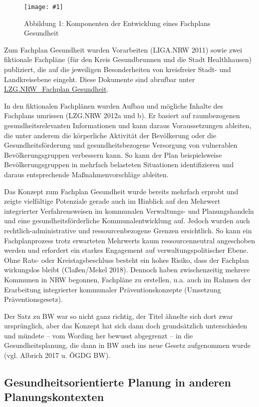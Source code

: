 \documentclass{article}
\newlength{\imgwidth}
\newcommand\scaledgraphics[2]{%
                
\settowidth{\imgwidth}{\texttt{[image: \#1]}}%
                
\setlength{\imgwidth}{\minof{\imgwidth}{#2\textwidth}}%
                
\texttt{[image: \#1]}%
                
}
\begin{document}
\begin{figure}
\scaledgraphics{51b1801d-0dfc-4206-a829-66270db0aee8.jpg}{1}
\caption*{Abbildung 1: Komponenten der Entwicklung eines Fachplans Gesundheit}\label{F19907881}
\end{figure}


Zum Fachplan Gesundheit wurden Vorarbeiten (LIGA.NRW 2011) sowie zwei fiktionale Fachpläne (für den Kreis Gesundbrunnen und die Stadt Healthhausen) publiziert, die auf die jeweiligen Besonderheiten von kreisfreier Stadt- und Landkreisebene eingeht. Diese Dokumente sind abrufbar unter \href{www.lzg.nrw.de/9116816}{LZG.NRW\_Fachplan Gesundheit}. 


In den fiktionalen Fachplänen wurden Aufbau und mögliche Inhalte des Fachplans umrissen (LZG.NRW 2012a und b). Er basiert auf raumbezogenen gesundheitsrelevanten Informationen und kann daraus Voraussetzungen ableiten, die unter anderem die körperliche Aktivität der Bevölkerung oder die Gesundheitsförderung und gesundheitsbezogene Versorgung von vulnerablen Bevölkerungsgruppen verbessern kann. So kann der Plan beispielsweise Bevölkerungsgruppen in mehrfach belasteten Situationen identifizieren und daraus entsprechende Maßnahmenvorschläge ableiten.


Das Konzept zum Fachplan Gesundheit wurde bereits mehrfach erprobt und zeigte vielfältige Potenziale gerade auch im Hinblick auf den Mehrwert integrierter Verfahrensweisen im kommunalen Verwaltungs- und Planungshandeln und eine gesundheitsförderliche Kommunalentwicklung auf. Jedoch wurden auch rechtlich-administrative und ressourcenbezogene Grenzen ersichtlich. So kann ein Fachplanprozess trotz erwarteten Mehrwerts kaum ressourcenneutral angeschoben werden und erfordert ein starkes Engagement auf verwaltungspolitischer Ebene. Ohne Rats- oder Kreistagsbeschluss besteht ein hohes Risiko, dass der Fachplan wirkungslos bleibt (Claßen/Mekel 2018). Dennoch haben zwischenzeitig mehrere Kommunen in NRW begonnen, Fachpläne zu erstellen, u.a. auch im Rahmen der Erarbeitung integrierter kommunaler Präventionskonzepte (Umsetzung Präventionsgesetz). 


Der Satz zu BW war so nicht ganz richtig, der Titel ähnelte sich dort zwar ursprünglich, aber das Konzept hat sich dann doch grundsätzlich unterschieden und mündete – vom Wording her bewusst abgegrenzt – in die Gesundheitsplanung, die dann in BW auch ins neue Gesetz aufgenommen wurde (vgl. Albrich 2017 u. ÖGDG BW). 


\subsection{Gesundheitsorientierte Planung in anderen Planungskontexten}\label{H2296124}
\end{document}

